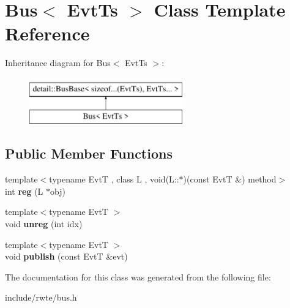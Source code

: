 \hypertarget{classBus}{}\section{Bus$<$ Evt\+Ts $>$ Class Template Reference}
\label{classBus}
Inheritance diagram for Bus$<$ Evt\+Ts $>$\+:\begin{figure}[H]
\begin{center}
\leavevmode
\includegraphics[height=2.000000cm]{classBus}
\end{center}
\end{figure}
\subsection*{Public Member Functions}
\begin{DoxyCompactItemize}
\item 
\mbox{\label{classBus_a994cd48b4440053e7825cf902f055101}} 
{\footnotesize template$<$typename EvtT , class L , void(\+L\+::$\ast$)(const Evt\+T \&) method$>$ }\\int {\bfseries reg} (L $\ast$obj)
\item 
\mbox{\label{classBus_a45b4e7a9b842d47674d79bd127921f0f}} 
{\footnotesize template$<$typename EvtT $>$ }\\void {\bfseries unreg} (int idx)
\item 
\mbox{\label{classBus_ab348b88f3cc60b34637c12d8ba973870}} 
{\footnotesize template$<$typename EvtT $>$ }\\void {\bfseries publish} (const EvtT \&evt)
\end{DoxyCompactItemize}


The documentation for this class was generated from the following file\+:\begin{DoxyCompactItemize}
\item 
include/rwte/bus.\+h\end{DoxyCompactItemize}
